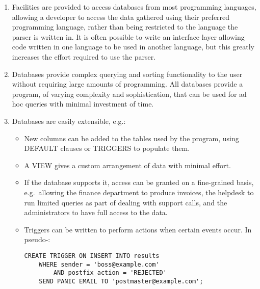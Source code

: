 \begin{enumerate}

    \item Facilities are provided to access databases from most programming
        languages, allowing a developer to access the data gathered using
        their preferred programming language, rather than being restricted
        to the language the parser is written in.  It is often possible to
        write an interface layer allowing code written in one language to
        be used in another language, but this greatly increases the effort
        required to use the parser.

    \item Databases provide complex querying and sorting functionality to
        the user without requiring large amounts of programming.  All
        databases provide a program, of varying complexity and
        sophistication, that can be used for ad hoc queries with minimal
        investment of time.

    \item Databases are easily extensible, e.g.:

        \begin{itemize}

            \item New columns can be added to the tables used by the
                program, using DEFAULT clauses or TRIGGERS to populate
                them.

            \item A VIEW gives a custom arrangement of data with minimal
                effort.

            \item If the database supports it, access can be granted on a
                fine-grained basis, e.g.\ allowing the finance department
                to produce invoices, the helpdesk to run limited queries as
                part of dealing with support calls, and the administrators
                to have full access to the data.

            \item Triggers can be written to perform actions when certain
                events occur.  In pseudo-\@:

\begin{verbatim}
CREATE TRIGGER ON INSERT INTO results
    WHERE sender = 'boss@example.com'
        AND postfix_action = 'REJECTED'
    SEND PANIC EMAIL TO 'postmaster@example.com';
\end{verbatim}


\end{itemize}
\end{enumerate}
